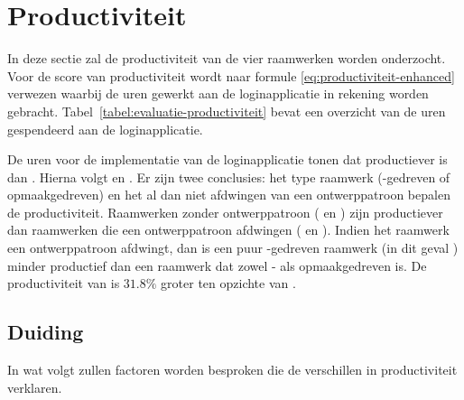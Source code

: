 \section{Productiviteit}
\label{sec:evaluatie-productiviteit}

In deze sectie zal de productiviteit van de vier raamwerken worden onderzocht.
Voor de score van productiviteit wordt naar formule \ref{eq:productiviteit-enhanced} verwezen waarbij de uren gewerkt aan de loginapplicatie in rekening worden gebracht. 
Tabel~\ref{tabel:evaluatie-productiviteit} bevat een overzicht van de uren gespendeerd aan de loginapplicatie.

\begin{table}
  \centering
  \caption{Overzicht van productiviteit.}
  \label{tabel:evaluatie-productiviteit}
\end{table}

De uren voor de implementatie van de loginapplicatie tonen dat \jqm{} productiever is dan \lungo{}. 
Hierna volgt \kendo{} en \st{}.
Er zijn twee conclusies: het type raamwerk (\js-gedreven of opmaakgedreven) en het al dan niet afdwingen van een ontwerppatroon bepalen de productiviteit.
Raamwerken zonder ontwerppatroon (\jqm{} en \lungo{}) zijn productiever dan raamwerken die een ontwerppatroon afdwingen (\st{} en \kendo{}).
Indien het raamwerk een ontwerppatroon afdwingt, dan is een puur \js{}-gedreven raamwerk (in dit geval \st{}) minder productief dan een raamwerk dat zowel \js{}- als opmaakgedreven is.
De productiviteit van \kendo{} is $31.8\%$ groter ten opzichte van \st{}.

\subsection{Duiding}
In wat volgt zullen factoren worden besproken die de verschillen in productiviteit verklaren.

